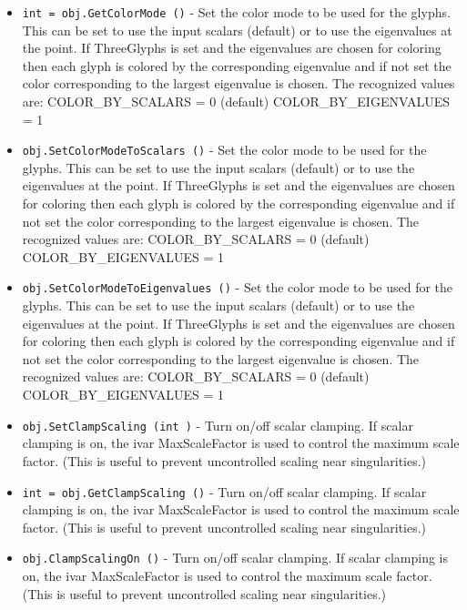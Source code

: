 \begin{itemize}
\item  \verb|int = obj.GetColorMode ()| -  Set the color mode to be used for the glyphs.  This can be set to
 use the input scalars (default) or to use the eigenvalues at the
 point.  If ThreeGlyphs is set and the eigenvalues are chosen for
 coloring then each glyph is colored by the corresponding
 eigenvalue and if not set the color corresponding to the largest
 eigenvalue is chosen.  The recognized values are:
 COLOR\_BY\_SCALARS = 0 (default)
 COLOR\_BY\_EIGENVALUES = 1

\item  \verb|obj.SetColorModeToScalars ()| -  Set the color mode to be used for the glyphs.  This can be set to
 use the input scalars (default) or to use the eigenvalues at the
 point.  If ThreeGlyphs is set and the eigenvalues are chosen for
 coloring then each glyph is colored by the corresponding
 eigenvalue and if not set the color corresponding to the largest
 eigenvalue is chosen.  The recognized values are:
 COLOR\_BY\_SCALARS = 0 (default)
 COLOR\_BY\_EIGENVALUES = 1

\item  \verb|obj.SetColorModeToEigenvalues ()| -  Set the color mode to be used for the glyphs.  This can be set to
 use the input scalars (default) or to use the eigenvalues at the
 point.  If ThreeGlyphs is set and the eigenvalues are chosen for
 coloring then each glyph is colored by the corresponding
 eigenvalue and if not set the color corresponding to the largest
 eigenvalue is chosen.  The recognized values are:
 COLOR\_BY\_SCALARS = 0 (default)
 COLOR\_BY\_EIGENVALUES = 1

\item  \verb|obj.SetClampScaling (int )| -  Turn on/off scalar clamping. If scalar clamping is on, the ivar
 MaxScaleFactor is used to control the maximum scale factor. (This is
 useful to prevent uncontrolled scaling near singularities.)

\item  \verb|int = obj.GetClampScaling ()| -  Turn on/off scalar clamping. If scalar clamping is on, the ivar
 MaxScaleFactor is used to control the maximum scale factor. (This is
 useful to prevent uncontrolled scaling near singularities.)

\item  \verb|obj.ClampScalingOn ()| -  Turn on/off scalar clamping. If scalar clamping is on, the ivar
 MaxScaleFactor is used to control the maximum scale factor. (This is
 useful to prevent uncontrolled scaling near singularities.)


\end{itemize}

